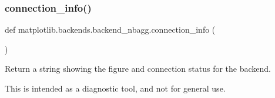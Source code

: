 \subsubsection{\texorpdfstring{connection\+\_\+info()}{connection\_info()}}
{\footnotesize\ttfamily def matplotlib.\+backends.\+backend\+\_\+nbagg.\+connection\+\_\+info (\begin{DoxyParamCaption}{ }\end{DoxyParamCaption})}

\begin{DoxyVerb}Return a string showing the figure and connection status for the backend.

This is intended as a diagnostic tool, and not for general use.
\end{DoxyVerb}
 